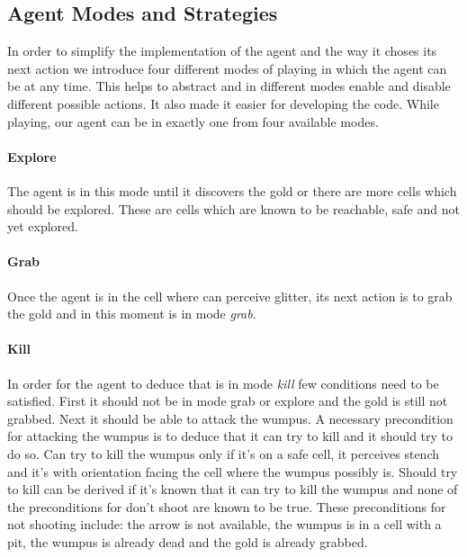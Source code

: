 \documentclass{llncs}
\begin{document}

\subsection{Agent Modes and Strategies}

In order to simplify the implementation of the agent and the way it choses its next action we introduce four different modes of playing in which the agent can be at any time. This helps to abstract and in different modes enable and disable different possible actions. It also made it easier for developing the code. 
While playing, our agent can be in exactly one from four available modes.

\paragraph{Explore} The agent is in this mode until it discovers the gold or there are more cells which should be explored. These are cells which are known to be reachable, safe and not yet explored. 

\paragraph{Grab} Once the agent is in the cell where can perceive glitter, its next action is to grab the gold and in this moment is in mode \emph{grab}. 

\paragraph{Kill} In order for the agent to deduce that is in mode \emph{kill} few conditions need to be satisfied. First it should not be in mode grab or explore and the gold is still not grabbed. Next it should be able to attack the wumpus. A necessary precondition for attacking the wumpus is to deduce that it can try to kill and it should try to do so. Can try to kill the wumpus only if it's on a safe cell, it perceives stench and it's with orientation facing the cell where the wumpus possibly is. 
Should try to kill can be derived if it's known that it can try to kill the wumpus and none of the preconditions for don't shoot are known to be true. These preconditions for not shooting include: the arrow is not available, the wumpus is in a cell with a pit, the wumpus is already dead and the gold is already grabbed. 
\end{document}
